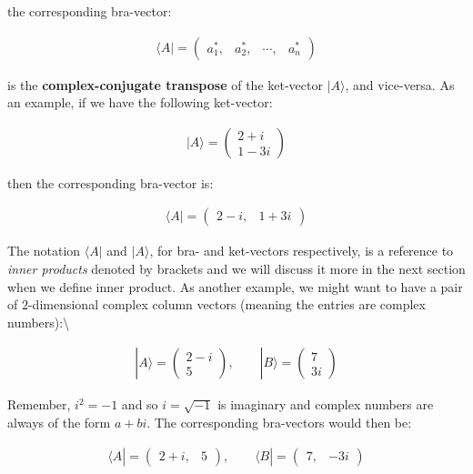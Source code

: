 \documentclass[11pt]{article}
\begin{document}
the corresponding bra-vector:

\begin{align} \langle A| = \begin{pmatrix}
a_1^*, & a_2^*, & \cdots, & a_n^*
\end{pmatrix} \end{align}

is the \textbf{complex-conjugate transpose} of the ket-vector
\(|A\rangle\), and vice-versa. As an example, if we have the following
ket-vector:

\begin{align} |A\rangle = \begin{pmatrix}
2+i \\ 1-3i
\end{pmatrix} \end{align}

then the corresponding bra-vector is:

\begin{align} \langle A| = \begin{pmatrix}
2-i, & 1+3i
\end{pmatrix} \end{align}

The notation \(\langle A|\) and \(|A\rangle\), for bra- and ket-vectors
respectively, is a reference to \emph{inner products} denoted by
brackets and we will discuss it more in the next section when we define
inner product. As another example, we might want to have a pair of
\(2\)-dimensional complex column vectors (meaning the entries are
complex numbers):\textbackslash{}

\begin{align} |A \rangle = \begin{pmatrix}
2-i \\ 5
\end{pmatrix}, \quad \quad
|B \rangle = \begin{pmatrix}
7 \\ 3i
\end{pmatrix} \end{align}

Remember, \(i^2 = -1\) and so \(i = \sqrt{-1}\) is imaginary and complex
numbers are always of the form \(a + bi\). The corresponding bra-vectors
would then be:

\begin{align} \langle A| = \begin{pmatrix}
2+i, & 5
\end{pmatrix}, \quad \quad \langle B| = \begin{pmatrix}
7, & -3i
\end{pmatrix} \end{align}
\end{document}
